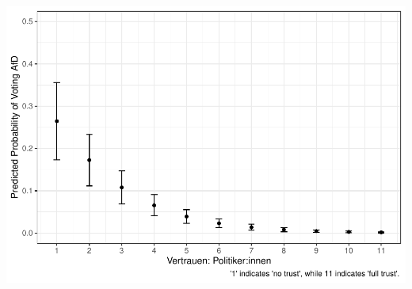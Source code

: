 \documentclass[
]{article}
\begin{document}
\includegraphics{AVCD_Final_Assignment-Edenhofer_files/figure-latex/afd-trust-politicians-1.pdf}
\end{document}
